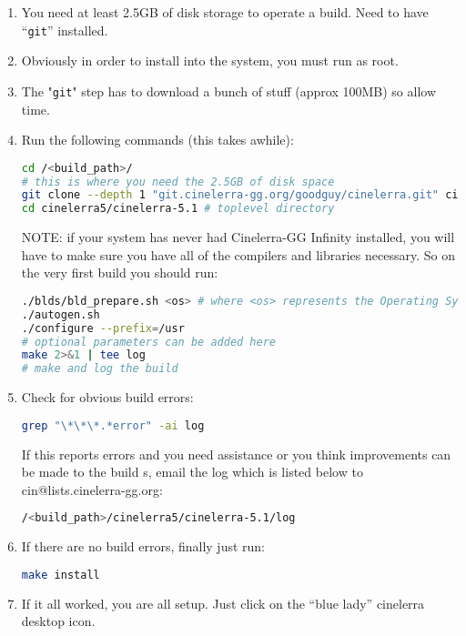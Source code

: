 \begin{enumerate}
    \item 
        You need at least 2.5GB of disk storage to operate a build. Need to have “\texttt{git}” installed.
    \item  Obviously in order to install into the system, you must run as root.
    \item  The "\texttt{git}" step has to download a bunch of stuff (approx 100MB) so allow time.
    \item  Run the following commands (this takes awhile):
        \begin{lstlisting}[language=bash]
cd /<build_path>/
# this is where you need the 2.5GB of disk space
git clone --depth 1 "git.cinelerra-gg.org/goodguy/cinelerra.git" cinelerra5
cd cinelerra5/cinelerra-5.1 # toplevel directory
        \end{lstlisting}
        NOTE: if your system has never had Cinelerra-GG Infinity installed, you will have to make sure you
        have all of the compilers and libraries necessary. So on the very first build you should run:

        \begin{lstlisting}[language=bash]
./blds/bld_prepare.sh <os> # where <os> represents the Operating System of centos, fedora, suse, leap, ubuntu, debian.
./autogen.sh
./configure --prefix=/usr
# optional parameters can be added here
make 2>&1 | tee log
# make and log the build
\end{lstlisting}
\item  Check for obvious build errors:
    \begin{lstlisting}[language=bash]
grep "\*\*\*.*error" -ai log
    \end{lstlisting}
    If this reports errors and you need assistance or you think improvements can be made to the build s,
    email the log which is listed below to cin@lists.cinelerra-gg.org:
    \begin{lstlisting}[language=bash]
/<build_path>/cinelerra5/cinelerra-5.1/log
    \end{lstlisting}
\item  If there are no build errors, finally just run:
    \begin{lstlisting}[language=bash]
    make install
    \end{lstlisting}
\item  If it all worked, you are all setup. Just click on the “blue lady” cinelerra desktop icon.
\end{enumerate}

